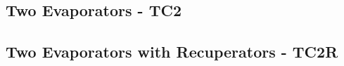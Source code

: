\documentclass[a4paper, 12pt]{article}
\begin{document}
\subsection{Two Evaporators - TC2}


\subsection{Two Evaporators with Recuperators - TC2R}



\newpage




\end{document}
